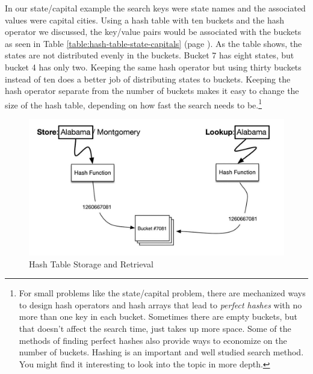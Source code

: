 In our state/capital example the search keys were state names and the
associated values were capital cities.
Using a hash table with ten buckets and the hash operator
we discussed, the key/value pairs would be associated with the
buckets as seen in
Table \ref{table:hash-table-state-capitals}
(page \pageref{table:hash-table-state-capitals}).
As the table shows, the states are not distributed evenly in the
buckets. Bucket 7 has
eight states, but bucket 4 has only two.
Keeping the same hash operator but using thirty buckets
instead of ten does a better job of distributing states to buckets.
Keeping the hash operator separate from the number of buckets
makes it easy to change the size of the
hash table, depending on how fast the search needs
to be.\footnote{For small problems like the state/capital problem,
there are mechanized ways to design hash operators and
hash arrays that lead to \emph{perfect hashes} with no
more than one key in each bucket. Sometimes there are
empty buckets, but that doesn't affect the search time,
just takes up more space. Some of the methods of
finding perfect hashes also provide ways to economize
on the number of buckets.
Hashing is an important and well studied search method.
You might find it interesting to look into the topic in more depth.}

\begin{figure}
\begin{center}
\includegraphics[scale=1]{images-cmyk/hash-table-process}
\end{center}
\caption{Hash Table Storage and Retrieval}
\label{fig:hash-table-process}
\end{figure}

